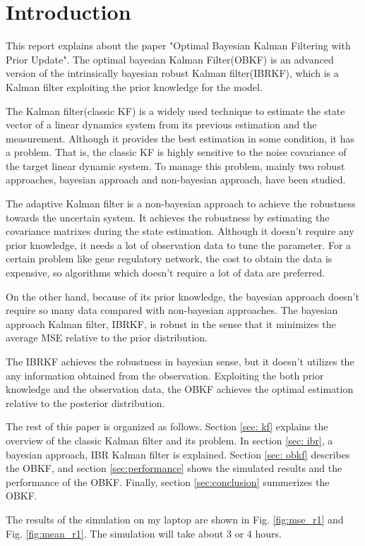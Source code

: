 \section{Introduction\label{introduction}}

This report explains about the paper "Optimal Bayesian Kalman Filtering with Prior Update"\cite{Dehghannasiri2018}. 
The optimal bayesian Kalman Filter(OBKF) is an advanced version of the intrinsically bayesian robust Kalman filter(IBRKF)\cite{Dehghannasiri2017}, which is a Kalman filter exploiting the prior knowledge for the model.

The Kalman filter(classic KF)\cite{Kalman1960} is a widely used technique to estimate the state vector of a linear dynamics system from its previous estimation and the measurement. Although it provides the best estimation in some condition, it has a problem. 
That is, the classic KF is highly sensitive to the noise covariance of the target linear dynamic system\cite{Sangsuk-Iam1990}. To manage this problem, mainly two robust approaches, bayesian approach and non-bayesian approach, have been studied. 

The adaptive Kalman filter\cite{Myers1976}\cite{Mehra1972} is a non-bayesian approach to achieve the robustness towards the uncertain system. It achieves the robustness by estimating the covariance matrixes during the state estimation. Although it doesn't require any prior knowledge, it needs a lot of observation data to tune the parameter. For a certain problem like gene regulatory network, the cost to obtain the data is expensive, so algorithms which doesn't require a lot of data are preferred.

On the other hand, because of its prior knowledge, the bayesian approach doesn't require so many data compared with non-bayesian approaches. The bayesian approach Kalman filter, IBRKF, is robust in the sense that it minimizes the average MSE relative to the prior distribution. 

The IBRKF achieves the robustness in bayesian sense, but it doesn't utilizes the any information obtained from the observation. Exploiting the both prior knowledge and the observation data, the OBKF achieves the optimal estimation relative to the posterior distribution.

The rest of this paper is organized as follows. Section \ref{sec: kf} explains the overview of the classic Kalman filter and its problem. In section \ref{sec: ibr}, a bayesian approach, IBR Kalman filter is explained. Section \ref{sec: obkf} describes the OBKF, and section \ref{sec:performance} shows the simulated results and the performance of the OBKF. Finally, section \ref{sec:conclusion} summerizes the OBKF. 

The results of the simulation on my laptop are shown in Fig. \ref{fig:mse_r1} and Fig. \ref{fig:mean_r1}. The simulation will take about 3 or 4 hours.